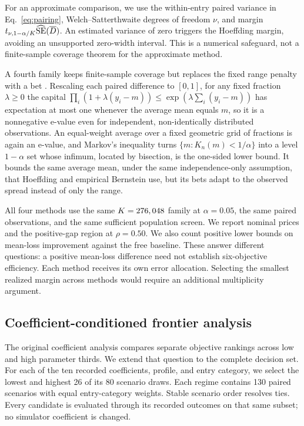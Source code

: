 \documentclass[conference,compsoc]{IEEEtran}
\begin{document}
For an approximate comparison, we use the within-entry paired variance in
Eq.~\ref{eq:pairing}, Welch--Satterthwaite degrees of freedom $\nu$, and
margin $t_{\nu,1-\alpha/K}\widehat{\rm SE}(\overline D)$. An estimated
variance of zero triggers the Hoeffding margin, avoiding an unsupported
zero-width interval. This is a numerical safeguard, not a finite-sample
coverage theorem for the approximate method.

A fourth family keeps finite-sample coverage but replaces the fixed range
penalty with a bet \cite{waudbysmith2023}. Rescaling each paired difference to
$[0,1]$, for any fixed fraction $\lambda\ge 0$ the capital
$\prod_i\left(1+\lambda(y_i-m)\right)\le\exp\!\left(\lambda\sum_i(y_i-m)\right)$
has expectation at most one whenever the average mean equals $m$, so it is a
nonnegative e-value even for independent, non-identically distributed
observations. An equal-weight average over a fixed geometric grid of fractions
is again an e-value, and Markov's inequality turns $\{m:K_n(m)<1/\alpha\}$ into a
level $1-\alpha$ set whose infimum, located by bisection, is the one-sided lower
bound. It bounds the same average mean, under the same independence-only
assumption, that Hoeffding and empirical Bernstein use, but its bets adapt to the
observed spread instead of only the range.

All four methods use the same $K=276,048{}$ family at
$\alpha=0.05$, the same paired observations, and the same sufficient
population screen. We report nominal prices and the positive-gap region at
$\rho=0.50$. We also count positive lower bounds on mean-loss improvement
against the free baseline. These answer different questions: a positive
mean-loss difference need not establish six-objective efficiency. Each
method receives its own error allocation. Selecting the smallest realized
margin across methods would require an additional multiplicity argument.

\subsection{Coefficient-conditioned frontier analysis}
The original coefficient analysis compares separate objective rankings across
low and high parameter thirds. We extend that question to the complete
decision set. For each of the ten recorded coefficients, profile, and entry
category, we select the lowest and highest 26 of its 80 scenario draws.
Each regime contains 130 paired scenarios with equal entry-category weights.
Stable scenario order resolves ties. Every candidate is evaluated through
its recorded outcomes on that same subset; no simulator coefficient is changed.
\end{document}
